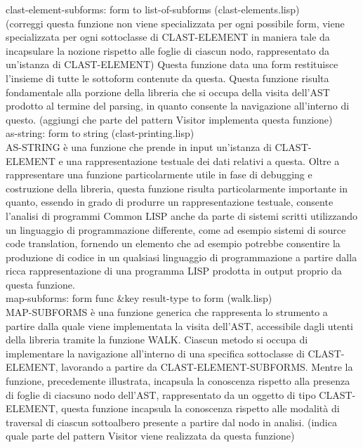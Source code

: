 clast-element-subforms: form to list-of-subforms (clast-elements.lisp)\\

(correggi questa funzione non viene specializzata per ogni possibile form, viene specializzata per ogni sottoclasse di CLAST-ELEMENT in maniera tale da incapsulare la nozione rispetto alle foglie di ciascun nodo, rappresentato da un'istanza di CLAST-ELEMENT) Questa funzione data una form restituisce l'insieme di tutte le sottoform contenute da questa. Questa funzione risulta fondamentale alla porzione della libreria che si occupa della visita dell'AST prodotto al termine del parsing, in quanto consente la navigazione all'interno di questo. (aggiungi che parte del pattern Visitor implementa questa funzione)\\

as-string: form to string (clast-printing.lisp)\\

AS-STRING è una funzione che prende in input un'istanza di CLAST-ELEMENT e una rappresentazione testuale dei dati relativi a questa. Oltre a rappresentare una funzione particolarmente utile in fase di debugging e costruzione della libreria, questa funzione risulta particolarmente importante in quanto, essendo in grado di produrre un rappresentazione testuale, consente l'analisi di programmi Common LISP anche da parte di sistemi scritti utilizzando un linguaggio di programmazione differente, come ad esempio sistemi di source code translation, fornendo un elemento che ad esempio potrebbe consentire la produzione di codice in un qualsiasi linguaggio di programmazione a partire dalla ricca rappresentazione di una programma LISP prodotta in output proprio da questa funzione.\\

map-subforms: form func \&key result-type to form (walk.lisp)\\

MAP-SUBFORMS è una funzione generica che rappresenta lo strumento a partire dalla quale viene implementata la visita dell'AST, accessibile dagli utenti della libreria tramite la funzione WALK. Ciascun metodo si occupa di implementare la navigazione all'interno di una specifica sottoclasse di CLAST-ELEMENT, lavorando a partire da CLAST-ELEMENT-SUBFORMS. Mentre la funzione, precedemente illustrata, incapsula la conoscenza rispetto alla presenza di foglie di ciacsuno nodo dell'AST, rappresentato da un oggetto di tipo CLAST-ELEMENT, questa funzione incapsula la conoscenza rispetto alle modalità di traversal di ciascun sottoalbero presente a partire dal nodo in analisi. (indica quale parte del pattern Visitor viene realizzata da questa funzione)\\

